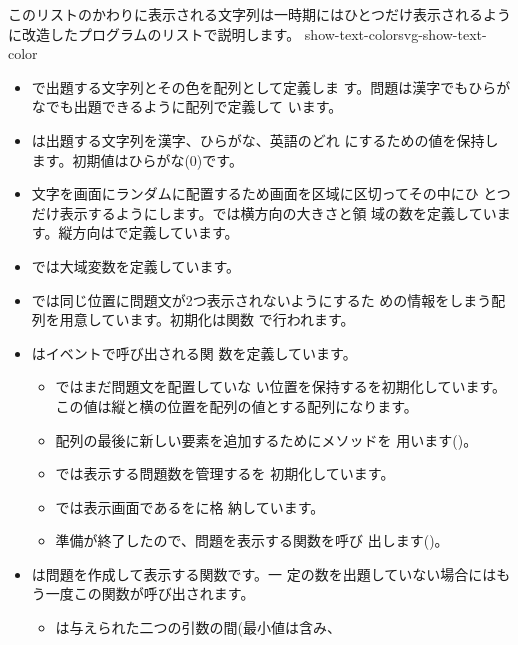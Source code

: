 このリストのかわりに表示される文字列は一時期にはひとつだけ表示されるよう
に改造したプログラムのリストで説明します。
{}
    {show-text-color}{svg-show-text-color}
\begin{itemize}
 \item {}で出題する文字列とその色を配列として定義しま
       す。問題は漢字でもひらがなでも出題できるように配列で定義して
       います。
 \item {}は出題する文字列を漢字、ひらがな、英語のどれ
       にするための値を保持します。初期値はひらがな($0$)です。
 \item 文字を画面にランダムに配置するため画面を区域に区切ってその中にひ
       とつだけ表示するようにします。では横方向の大きさと領
       域の数を定義しています。縦方向はで定義しています。
 \item {}では大域変数を定義しています。
 \item {}では同じ位置に問題文が2つ表示されないようにするた
       めの情報をしまう配列を用意しています。初期化は関数
       で行われます。
 \item {}はイベントで呼び出される関
       数を定義しています。
\begin{itemize}
 \item {}ではまだ問題文を配置していな
       い位置を保持するを初期化しています。
       この値は縦と横の位置を配列の値とする配列になります。
 \item 配列の最後に新しい要素を追加するためにメソッドを
       用います()。
 \item {}では表示する問題数を管理するを
       初期化しています。
 \item {}では表示画面であるをに格
       納しています。
 \item 準備が終了したので、問題を表示する関数を呼び
       出します()。
\end{itemize}
 \item {}は問題を作成して表示する関数です。一
       定の数を出題していない場合にはもう一度この関数が呼び出されます。
\begin{itemize}
 \item {}は与えられた二つの引数の間(最小値は含み、

\end{itemize}
\end{itemize}
